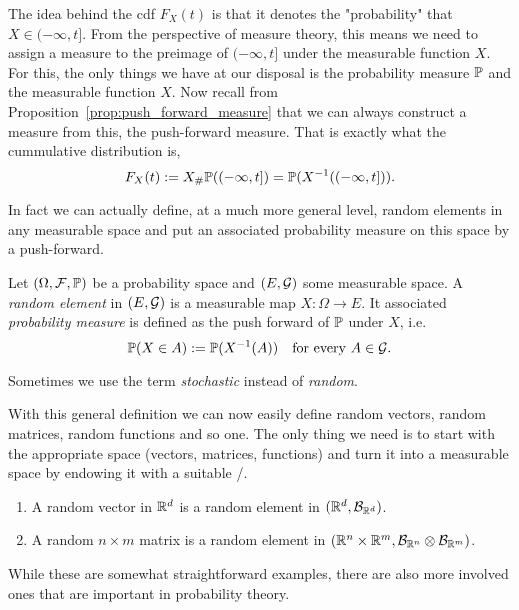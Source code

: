 The idea behind the cdf $F_X(t)$ is that it denotes the "probability" that $X \in (-\infty ,t]$. From the perspective of measure theory, this means we need to assign a measure to the preimage of $(-\infty, t]$ under the measurable function $X$. For this, the only things we have at our disposal is the probability measure $\mathbb P$ and the measurable function $X$. Now recall from Proposition~\ref{prop:push_forward_measure} that we can always construct a measure from this, the push-forward measure. That is exactly what the cummulative distribution is,
\[
	F_X(t) := X_\# \mathbb P((-\infty, t]) = \mathbb P(X^{-1}((-\infty,t])).
\]

In fact we can actually define, at a much more general level, random elements in any measurable space and put an associated probability measure on this space by a push-forward.

\begin{definition}
Let $(\Omega,\mathcal F, \mathbb P)$ be a probability space and $(E,\mathcal G)$ some measurable space. A \emph{random element} in $(E,\mathcal G)$ is a measurable map $X : \Omega \to E$. It associated \emph{probability measure} is defined as the push forward of $\mathbb P$ under $X$, i.e.
\[
	\mathbb P(X \in A) := \mathbb P(X^{-1}(A)) \quad \text{for every } A \in \mathcal G.
\]
\end{definition}

Sometimes we use the term \emph{stochastic} instead of \emph{random}. 

With this general definition we can now easily define random vectors, random matrices, random functions and so one. The only thing we need is to start with the appropriate space (vectors, matrices, functions) and turn it into a measurable space by endowing it with a suitable \sigalg/. 

\begin{example}
\hfill
\begin{enumerate}[label=(\alph*)]
\item A random vector in $\mathbb R^d$ is a random element in $(\mathbb R^d, \mathcal B_{\mathbb R^d})$.
\item A random $n \times m$ matrix is a random element in $(\mathbb R^n \times \mathbb R^m, \mathcal B_{\mathbb R^n} \otimes \mathcal B_{\mathbb R^m})$.
\end{enumerate}
\end{example}

While these are somewhat straightforward examples, there are also more involved ones that are important in probability theory.

